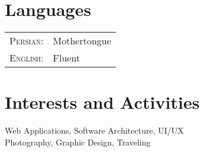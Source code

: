 \documentclass[a4paper,10pt]{article}
\begin{document}
\section{Languages}
\begin{tabular}{rl}
 \textsc{Persian:}&Mothertongue\\
\textsc{English:}&Fluent
\end{tabular}

\section{Interests and Activities}
Web Applications, Software Architecture, UI/UX\\
Photography, Graphic Design, Traveling


\end{document}
